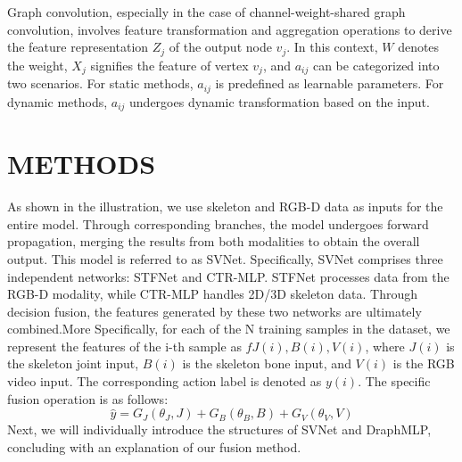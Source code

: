 \documentclass[conference,a4paper,english]{IEEEtran}[2015/08/26]
\begin{document}
Graph convolution, especially in the case of channel-weight-shared graph convolution, involves feature transformation and aggregation operations to derive the feature representation \(Z_j\) of the output node \(v_j\). In this context, \(W\) denotes the weight, \(X_j\) signifies the feature of vertex \(v_j\), and \(a_{ij}\) can be categorized into two scenarios. For static methods, \(a_{ij}\) is predefined as learnable parameters. For dynamic methods, \(a_{ij}\) undergoes dynamic transformation based on the input.


\section{METHODS}
\label{sec:latexhints}

\newcount\LTGbeginlineexample
\newcount\LTGendlineexample
\newenvironment{ltgexample}%
{\LTGbeginlineexample=\numexpr\inputlineno+1\relax}%
{\LTGendlineexample=\numexpr\inputlineno-1\relax%
%
\tcbinputlisting{%
  listing only,
  listing file=\currfilepath,
  colback=green!5!white,
  colframe=green!25,
  coltitle=black!90,
  coltext=black!90,
  left=8mm,
  title=Corresponding \LaTeX{} code of \texttt{\currfilepath},
  listing options={%
    frame=none,
    language={[LaTeX]TeX},
    escapeinside={},
    firstline=\the\LTGbeginlineexample,
    lastline=\the\LTGendlineexample,
    firstnumber=\the\LTGbeginlineexample,
    basewidth=.5em,
    aboveskip=0mm,
    belowskip=0mm,
    numbers=left,
    xleftmargin=0mm,
    numberstyle=\tiny,
    numbersep=8pt%
  }
}
}%
As shown in the illustration, we use skeleton and RGB-D data as inputs for the entire model. 
Through corresponding branches, the model undergoes forward propagation, 
merging the results from both modalities to obtain the overall output. This model is referred to as SVNet.
 Specifically, SVNet comprises three independent networks: STFNet and CTR-MLP. 
 STFNet processes data from the RGB-D modality, while CTR-MLP handles 2D/3D skeleton data. 
 Through decision fusion, the features generated by these two networks are ultimately combined.More Specifically,
for each of the N training samples in the dataset, we represent the features of the i-th sample as
  \(fJ(i), B(i), V(i)\), where \(J(i)\) is the skeleton joint input, \(B(i)\) is the skeleton bone input,
  and \(V(i)\) is the RGB video input. The corresponding action label is denoted as \(y(i)\). 
  The specific fusion operation is as follows:
\[
\hat{y} = G_J(\theta_J, J) + G_B(\theta_B, B)+ G_V(\theta_V, V) \tag{4}
\]
Next, we will individually introduce the structures of SVNet and DraphMLP, 
concluding with an explanation of our fusion method.
\end{document}
